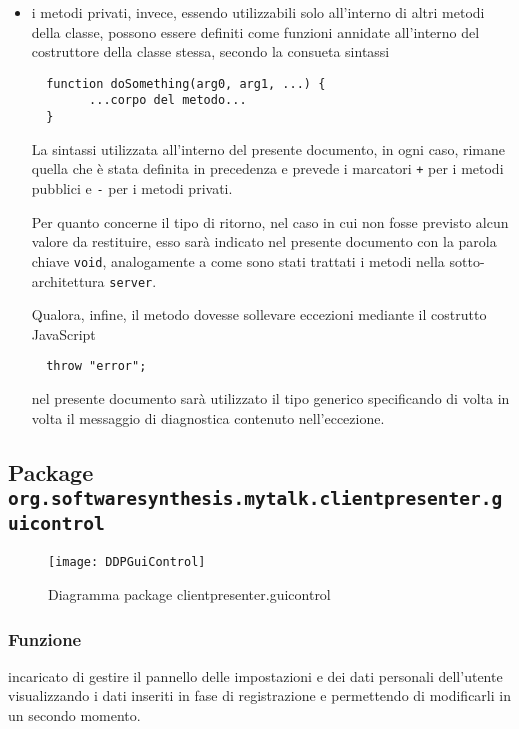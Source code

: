 \begin{description}
\begin{itemize}
\item i metodi privati, invece, essendo utilizzabili solo all'interno di altri metodi della classe, possono essere definiti come funzioni annidate all'interno del costruttore della classe stessa, secondo la consueta sintassi
\begin{verbatim}
  function doSomething(arg0, arg1, ...) {
        ...corpo del metodo...
  }
\end{verbatim}

La sintassi utilizzata all'interno del presente documento, in ogni caso, rimane quella che è stata definita in precedenza e prevede i marcatori \verb|+| per i metodi pubblici e \verb|-| per i metodi privati.

Per quanto concerne il tipo di ritorno, nel caso in cui non fosse previsto alcun valore da restituire, esso sarà indicato nel presente documento con la parola chiave \texttt{void}, analogamente a come sono stati trattati i metodi nella sotto-architettura \texttt{server}.

Qualora, infine, il metodo dovesse sollevare eccezioni mediante il costrutto JavaScript
\begin{verbatim}
  throw "error";
\end{verbatim}
nel presente documento sarà utilizzato il tipo generico  specificando di volta in volta il messaggio di diagnostica contenuto nell'eccezione.

	\end{itemize}
\end{description}

\subsection{Package \texttt{org.softwaresynthesis.mytalk.clientpresenter.guicontrol}}\label{sec:guicontrol}

\begin{center}
\begin{figure}[H]
  \texttt{[image: DDPGuiControl]}
\caption{Diagramma package clientpresenter.guicontrol}
\end{figure}
\end{center}

\subsubsection*{Funzione}
 incaricato di gestire il pannello delle impostazioni e dei dati personali dell'utente visualizzando i dati inseriti in fase di registrazione e permettendo di modificarli in un secondo momento.

